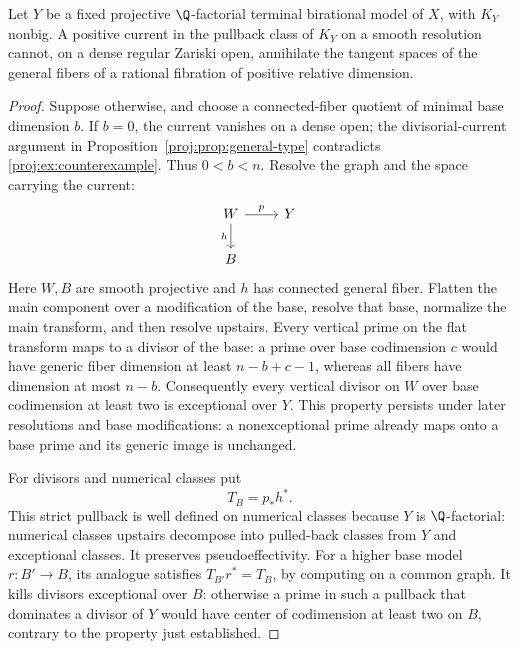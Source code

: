 \begin{proposition}\label{proj:prop:no-pullback}
Let \(Y\) be a fixed projective \(\Q\)-factorial terminal
birational model of \(X\), with \(K_Y\) nonbig. A positive current
in the pullback class of \(K_Y\) on a smooth resolution cannot,
on a dense regular Zariski open, annihilate the tangent spaces
of the general fibers of a rational fibration of positive
relative dimension.
\end{proposition}
\begin{proof}
Suppose otherwise, and choose a connected-fiber quotient of
minimal base dimension \(b\). If \(b=0\), the current vanishes on
a dense open; the divisorial-current argument in
Proposition~\ref{proj:prop:general-type} contradicts
\eqref{proj:ex:counterexample}. Thus \(0<b<n\).
Resolve the graph and the space carrying the current:
\[
 \begin{tikzcd}
 W \arrow[r,"p"] \arrow[d,"h"'] & Y \\
 B &
 \end{tikzcd}
\]
Here \(W,B\) are smooth projective and \(h\) has connected
general fiber. Flatten the main component over a modification of
the base, resolve that base, normalize the main transform, and
then resolve upstairs. Every vertical prime on the flat
transform maps to a divisor of the base: a prime over base
codimension \(c\) would have generic fiber dimension at least
\(n-b+c-1\), whereas all fibers have dimension at most \(n-b\).
Consequently every vertical divisor
on \(W\) over base codimension at least two is exceptional over
\(Y\). This property persists under later resolutions and base
modifications: a nonexceptional prime already maps onto a base
prime and its generic image is unchanged.

For divisors and numerical classes put
\[
 T_B=p_*h^*.
\]
This strict pullback is well defined on numerical classes because
\(Y\) is \(\Q\)-factorial: numerical classes upstairs decompose
into pulled-back classes from \(Y\) and exceptional classes.
It preserves pseudoeffectivity. For a higher base model
\(r:B'\to B\), its analogue satisfies
\(T_{B'}r^*=T_B\), by computing on a common graph.
It kills divisors exceptional over \(B\): otherwise a prime
in such a pullback that dominates a divisor of \(Y\) would
have center of codimension at least two on \(B\), contrary
to the property just established.


\end{proof}
